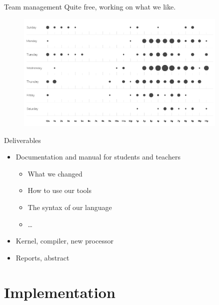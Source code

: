 \documentclass{beamer}
\begin{document}
      \begin{frame}{Team management}
        Quite free, working on what we like.

        \begin{figure}
          \centering
          \includegraphics[width=0.9\textwidth]{fig/punchcard.png}
        \end{figure}
      \end{frame}

      \begin{frame}{Deliverables}
        \begin{itemize}
          \item Documentation and manual for students and teachers
            \begin{itemize}
              \item What we changed
              \item How to use our tools
              \item The syntax of our language
              \item \dots
            \end{itemize}
          \item Kernel, compiler, new processor
          \item Reports, abstract
        \end{itemize}
      \end{frame}

  \section{Implementation}
\end{document}
